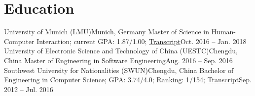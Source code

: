 \section{\textbf{Education}}
  \resumeSubHeadingListStart
    \resumeSubheading
      {University of Munich (LMU)}{Munich, Germany}
      {Master of Science in Human-Computer Interaction; current GPA: 1.87/1.00; \href{https://github.com/changkun/resume/blob/master/assets/transcript-master-hci.pdf}{Transcript}}{Oct. 2016 -- Jan. 2018}
    \resumeSubheading
      {University of Electronic Science and Technology of China (UESTC)}{Chengdu, China}
      {Master of Engineering in Software Engineering}{Aug. 2016 -- Sep. 2016}
    \resumeSubheading
      {Southwest University for Nationalities (SWUN)}{Chengdu, China}
      {Bachelor of Engineering in Computer Science;  GPA: 3.74/4.0; Ranking: 1/154; \href{https://github.com/changkun/resume/blob/master/assets/bachelor-transcript.pdf}{Transcript}}{Sep. 2012 -- Jul. 2016}
  \resumeSubHeadingListEnd